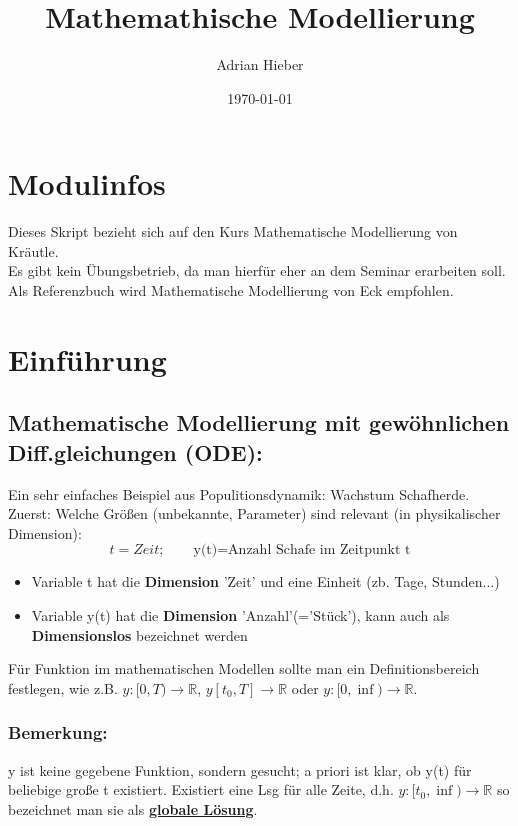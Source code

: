 \documentclass{article}
\title{Mathemathische Modellierung}
\author{Adrian Hieber}
\date{\today}
\numberwithin{equation}{section}
\begin{document}
\maketitle	
\newpage

\tableofcontents
\newpage


\section{Modulinfos}

Dieses Skript bezieht sich auf den Kurs Mathematische Modellierung von Kräutle. \cite{studon}\\
Es gibt kein Übungsbetrieb, da man hierfür eher an dem Seminar erarbeiten soll.\\
Als Referenzbuch wird Mathematische Modellierung von Eck\cite{eck} empfohlen.


\section{Einführung}

\subsection{Mathematische Modellierung mit gewöhnlichen Diff.gleichungen (ODE):}
Ein sehr einfaches Beispiel aus Populitionsdynamik: Wachstum Schafherde.\\
Zuerst: Welche Größen (unbekannte, Parameter) sind relevant (in physikalischer Dimension):
\begin{equation}
t=Zeit; \qquad \text{y(t)=Anzahl Schafe im Zeitpunkt t}
\end{equation}
\begin{itemize}
    \item Variable t hat die \textbf{Dimension} 'Zeit' und eine Einheit (zb. Tage, Stunden...)
    \item Variable y(t) hat die \textbf{Dimension} 'Anzahl'(='Stück'), kann auch als \textbf{Dimensionslos} bezeichnet werden
\end{itemize}
Für Funktion im mathematischen Modellen sollte man ein Definitionsbereich festlegen, wie z.B. $y:[0,T)\rightarrow\mathbb{R}$, $y[t_0, T]\rightarrow\mathbb{R}$ oder $y:[0,\inf)\rightarrow\mathbb{R}$.

\subsubsection{Bemerkung:}
y ist keine gegebene Funktion, sondern gesucht; a priori ist klar, ob y(t) für beliebige große t existiert.
Existiert eine Lsg für alle Zeite, d.h. $y:[t_0,\inf)\rightarrow\mathbb{R}$ so bezeichnet man sie als \textbf{\underline{globale Lösung}}.
\end{document}
